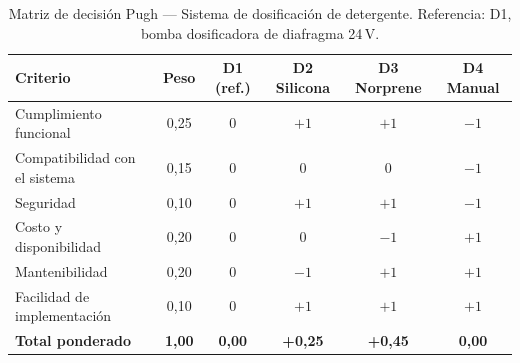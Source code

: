 \begin{table}[H]
\centering
\caption{Matriz de decisión Pugh --- Sistema de dosificación de detergente. Referencia: D1, bomba dosificadora de diafragma 24\,V.}
\label{tab:pugh-dosificacion}
\begin{tabularx}{\textwidth}{Xccccc}
\toprule
\textbf{Criterio} & \textbf{Peso} & \textbf{D1 (ref.)} & \textbf{D2 Silicona} & \textbf{D3 Norprene} & \textbf{D4 Manual} \\
\midrule
Cumplimiento funcional        & 0,25 & 0 & $+1$ & $+1$ & $-1$ \\
Compatibilidad con el sistema & 0,15 & 0 & 0    & 0    & $-1$ \\
Seguridad                     & 0,10 & 0 & $+1$ & $+1$ & $-1$ \\
Costo y disponibilidad        & 0,20 & 0 & 0    & $-1$ & $+1$ \\
Mantenibilidad                & 0,20 & 0 & $-1$ & $+1$ & $+1$ \\
Facilidad de implementación   & 0,10 & 0 & $+1$ & $+1$ & $+1$ \\
\midrule
\textbf{Total ponderado}      & \textbf{1,00} & \textbf{0,00} & \textbf{+0,25} & \textbf{+0,45} & \textbf{0,00} \\
\bottomrule
\end{tabularx}
\end{table}
